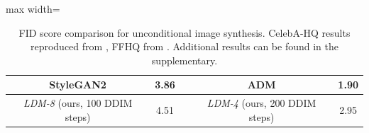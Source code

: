{\begin{table}[t]
\begin{footnotesize}
\begin{adjustbox}{max width=\linewidth}
\begin{tabular}{ccccc}
    StyleGAN2\cite{DBLP:journals/corr/abs-1912-04958} & 3.86 &  & ADM \cite{DBLP:journals/corr/abs-2105-05233} & 1.90\\
    \midrule
    \emph{LDM-8} (ours, 100 DDIM steps) & 4.51 & & \emph{LDM-4} (ours, 200 DDIM steps) & 2.95 \\
    \bottomrule
  \end{tabular}
  \end{adjustbox}\vspace{-2.6em}
\end{footnotesize}
  \caption{\label{tab:fids} FID score comparison for unconditional image
  synthesis. CelebA-HQ results reproduced from
  \cite{DBLP:conf/cvpr/ParmarLLT21,DBLP:conf/iclr/XiaoKKV21,DBLP:journals/corr/abs-2106-05527},
  FFHQ from
  \cite{DBLP:journals/corr/abs-1912-04958,DBLP:journals/corr/abs-2106-05527}.
  Additional results can be found in the supplementary.\vspace{-1.6em}}
\end{table}
}


